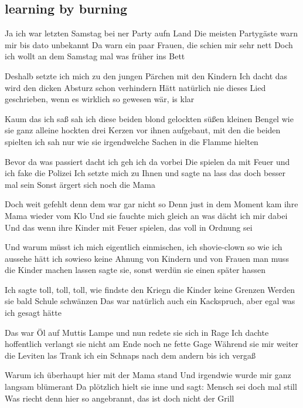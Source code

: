 \subsection*{learning by burning   }
\begin{guitar}
Ja ich war letzten Samstag bei ner Party aufn Land
Die meisten Partygäste warn mir bis dato unbekannt
Da warn ein paar Frauen, die schien mir sehr nett
Doch ich wollt an dem Samstag mal was früher ins Bett

Deshalb setzte ich mich zu den jungen Pärchen mit den Kindern
Ich dacht das wird den dicken Absturz schon verhindern
Hätt natürlich nie dieses Lied geschrieben, 
wenn es wirklich so gewesen wär, is klar

Kaum das ich saß sah ich diese beiden blond gelockten
süßen kleinen Bengel wie sie ganz alleine hockten
drei Kerzen vor ihnen aufgebaut, mit den die beiden spielten
ich sah nur wie sie irgendwelche Sachen in die Flamme hielten

Bevor da was passiert dacht ich geh ich da vorbei
Die spielen da mit Feuer und ich fake die Polizei
Ich setzte mich zu Ihnen und sagte na lass das doch besser mal sein
Sonst ärgert sich noch die Mama

Doch weit gefehlt denn dem war gar nicht so
Denn just in dem Moment kam ihre Mama wieder vom Klo
Und sie fauchte mich gleich an was dächt ich mir dabei
Und das wenn ihre Kinder mit Feuer spielen, das voll in Ordnung sei

Und warum müsst ich mich eigentlich einmischen, ich shovie-clown
so wie ich aussehe hätt ich sowieso keine Ahnung von Kindern und von Frauen
man muss die Kinder machen lassen
sagte sie, sonst werdün sie einen später hassen

Ich sagte toll, toll, toll, wie findste den
Kriegn die Kinder keine Grenzen
Werden sie bald Schule schwänzen
Das war natürlich auch ein Kackspruch, aber egal was ich gesagt hätte

Das war Öl auf Muttis Lampe und nun redete sie sich in Rage
Ich dachte hoffentlich verlangt sie nicht am Ende noch ne fette Gage
Während sie mir weiter die Leviten las
Trank ich ein Schnaps nach dem andern bis ich vergaß

Warum ich überhaupt hier mit der Mama stand
Und irgendwie wurde mir ganz langsam blümerant
Da plötzlich hielt sie inne und sagt: Mensch sei doch mal still
Was riecht denn hier so angebrannt, das ist doch nicht der Grill




\end{guitar}
